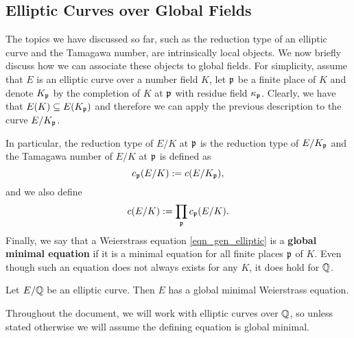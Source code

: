 
\subsection{Elliptic Curves over Global Fields}

The topics we have discussed so far, such as the reduction type of an elliptic curve and the Tamagawa number, are intrinsically local objects. We now briefly discuss how we can associate these objects to global fields. For simplicity, assume that $E$ is an elliptic curve over a number field $K$, let $\mathfrak{p}$ be a finite place of $K$ and denote $K_{\mathfrak{p}}$ by the completion of $K$ at $\mathfrak{p}$ with residue field $\kappa_{\mathfrak{p}}$. Clearly, we have that $E(K)\subseteq E(K_{\mathfrak{p}})$ and therefore we can apply the previous description to the curve $E/K_{\mathfrak{p}}$.

In particular, the reduction type of $E/K$ at $\mathfrak{p}$ is the reduction type of $E/K_{\mathfrak{p}}$ and the Tamagawa number of $E/K$ at $\mathfrak{p}$ is defined as 
$$c_{\mathfrak{p}}(E/K):=c(E/K_{\mathfrak{p}}),$$
and we also define 
$$c(E/K):=\prod_{\mathfrak{p}} c_{\mathfrak{p}}(E/K).$$
Finally, we say that a Weierstrass equation \eqref{eqn_gen_elliptic} is a \textbf{global minimal equation} if it is a minimal equation for all finite places $\mathfrak{p}$ of $K$. Even though such an equation does not always exists for any $K$, it does hold for $\mathbb{Q}$.

\begin{prop}\label{prop_globmin}
    Let $E/\mathbb{Q}$ be an elliptic curve. Then $E$ has a global minimal Weierstrass equation.
\end{prop}

Throughout the document, we will work with elliptic curves over $\mathbb{Q}$, so unless stated otherwise we will assume the defining equation is global minimal.